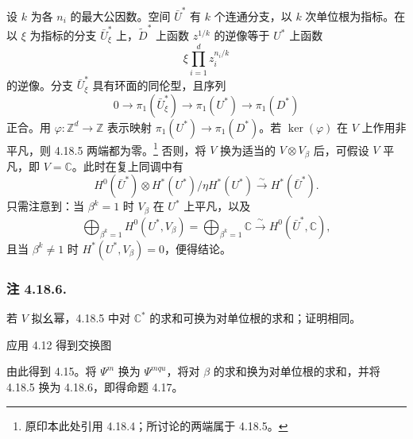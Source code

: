 设 $k$ 为各 $n_i$ 的最大公因数。空间 $\bar U^*$ 有 $k$ 个连通分支，以 $k$ 次单位根为指标。在以 $\xi$ 为指标的分支 $\bar U_\xi^*$ 上，$\widetilde D^*$ 上函数 $z^{1/k}$ 的逆像等于 $U^*$ 上函数
\[
\xi\prod_{i=1}^d z_i^{n_i/k}
\]
的逆像。分支 $\bar U_\xi^*$ 具有环面的同伦型，且序列
\[
0\longrightarrow\pi_1(\bar U_\xi^*)
 \longrightarrow\pi_1(U^*)\longrightarrow\pi_1(D^*)
\]
正合。用 $\varphi:\mathbb Z^d\to\mathbb Z$ 表示映射 $\pi_1(U^*)\to\pi_1(D^*)$。若 $\ker(\varphi)$ 在 $V$ 上作用非平凡，则 4.18.5 两端都为零。\footnote{原印本此处引用 4.18.4；所讨论的两端属于 4.18.5。}
否则，将 $V$ 换为适当的 $V\otimes V_\beta$ 后，可假设 $V$ 平凡，即 $V=\mathbb C$。此时在复上同调中有
\[
H^0(\bar U^*)\otimes
 H^*(U^*)/\eta H^*(U^*)
 \xrightarrow{\ \sim\ }H^*(\bar U^*).
\]
只需注意到：当 $\beta^k=1$ 时 $V_\beta$ 在 $U^*$ 上平凡，以及
\[
\bigoplus_{\beta^k=1}H^0(U^*,V_\beta)
=\bigoplus_{\beta^k=1}\mathbb C
 \xrightarrow{\ \sim\ }H^0(\bar U^*,\mathbb C),
\]
且当 $\beta^k\ne1$ 时 $H^*(U^*,V_\beta)=0$，便得结论。

\subsubsection*{注 4.18.6.}
若 $V$ 拟幺幂，4.18.5 中对 $\mathbb C^*$ 的求和可换为对单位根的求和；证明相同。

应用 4.12 得到交换图
\begin{center}
\end{center}
由此得到 4.15。将 $\Psi^m$ 换为 $\Psi^{mqu}$，将对 $\beta$ 的求和换为对单位根的求和，并将 4.18.5 换为 4.18.6，即得命题 4.17。
